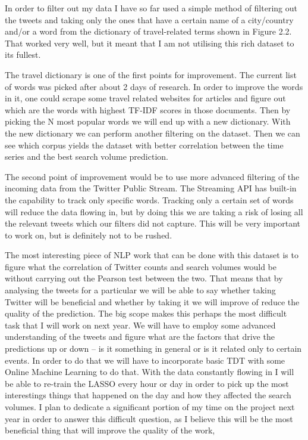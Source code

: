 \documentclass[minf,twoside,singlespacing,parskip,frontabs,notimes,11pt]{infthesis}
\begin{document}
In order to filter out my data I have so far used a simple method of filtering out the tweets and taking only the ones that have a certain name of a city/country and/or a word from the dictionary of travel-related terms shown in Figure 2.2. That worked very well, but it meant that I am not utilising this rich dataset to its fullest. 


The travel dictionary is one of the first points for improvement. The current list of words was picked after about 2 days of research. In order to improve the words in it, one could scrape some travel related websites for articles and figure out which are the words with highest TF-IDF scores in those documents. Then by picking the N most popular words we will end up with a new dictionary. With the new dictionary we can perform another filtering on the dataset. Then we can see which corpus yields the dataset with better correlation between the time series and the best search volume prediction.


The second point of improvement would be to use more advanced filtering of the incoming data from the Twitter Public Stream. The Streaming API has built-in the capability to track only specific words. Tracking only a certain set of words will reduce the data flowing in, but by doing this we are taking a risk of losing all the relevant tweets which our filters did not capture. This will be very important to work on, but is definitely not to be rushed.


The most interesting piece of NLP work that can be done with this dataset is to figure what the correlation of Twitter counts and search volumes would be without carrying out the Pearson test between the two. That means that by analysing the tweets for a particular we will be able to say whether taking Twitter will be beneficial and whether by taking it we will improve of reduce the quality of the prediction. The big scope makes this perhaps the most difficult task that I will work on next year. We will have to employ some advanced understanding of the tweets and figure what are the factors that drive the predictions up or down -- is it something in general or is it related only to certain events. In order to do that we will have to incorporate basic TDT with some Online Machine Learning to do that. With the data constantly flowing in I will be able to re-train the LASSO every hour or day in order to pick up the most interestings things that happened on the day and how they affected the search volumes. I plan to dedicate a significant portion of my time on the project next year in order to answer this difficult question, as I believe this will be the most beneficial thing that will improve the quality of the work,
\end{document}
